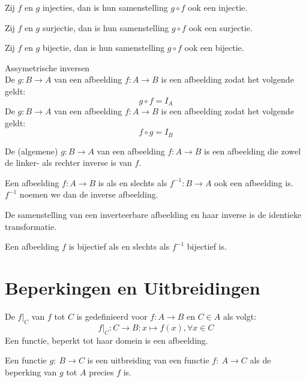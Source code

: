 \documentclass[main.tex]{subfiles}
\begin{document}
\begin{st}
  Zij $f$ en $g$ injecties, dan is hun samenstelling $g \circ f$ ook een injectie.
\end{st}

\begin{st}
  Zij $f$ en $g$ surjectie, dan is hun samenstelling $g \circ f$ ook een surjectie.
\end{st}

\begin{st}
  Zij $f$ en $g$ bijectie, dan is hun samenstelling $g \circ f$ ook een bijectie.
\end{st}

\begin{de}
  Assymetrische inversen\\
  De  $g:B \rightarrow A$ van een afbeelding $f:A \rightarrow B$ is een afbeelding zodat het volgende geldt:
  \[ g \circ f = I_{A} \]
  De  $g:B \rightarrow A$ van een afbeelding $f:A \rightarrow B$ is een afbeelding zodat het volgende geldt:
  \[ f \circ g = I_{B}\]
\end{de}

\begin{de}
  De (algemene)  $g:B \rightarrow A$ van een afbeelding $f:A \rightarrow B$ is een afbeelding die zowel de linker- als rechter inverse is van $f$.
\end{de}

\begin{de}
  Een afbeelding $f: A \rightarrow B$ is  als en slechts als $f^{-1}: B \rightarrow A$ ook een afbeelding is. $f^{-1}$ noemen we dan de inverse afbeelding.
\end{de}

\begin{st}
  \label{st:afb+inverse=identieke}
  De samenstelling van een inverteerbare afbeelding en haar inverse is de identieke transformatie.
\end{st}

\begin{st}
  \label{st:f-bijec-asa-f-1-bijec}
  Een afbeelding $f$ is bijectief als en slechts als $f^{-1}$ bijectief is.
\end{st}

\section{Beperkingen en Uitbreidingen}
\label{sec:uitbreiding}

\begin{de}
  De  $f|_{C}$ van $f$ tot $C$ is gedefinieerd voor $f: A \rightarrow B$ en $C \in A$ als volgt:
  \[ f|_{C}: C \rightarrow B: x \mapsto f(x), \forall x \in C\]
  Een functie, beperkt tot haar domein is een afbeelding.
\end{de}

\begin{de}
  Een functie $g:\ B \rightarrow C$ is een uitbreiding van een functie $f:\ A \rightarrow C$ als de beperking van $g$ tot $A$ precies $f$ is.
\end{de}
\end{document}

